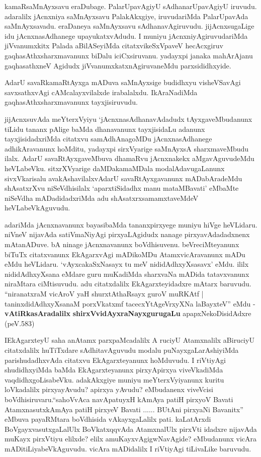\begin{artha}
kamaRsaMnAyxsavu eraDubage. PalarUpavAgiyU sAdhanarUpavAgiyU
iruvudu. adaralilx jAcnxniya saMnAyxsavu PalakAkxgiye, iruvudariMda
PalarUpavAda saMnAyxsavadu. eraDaneya saMnAyxsavu
sAdhanavAgiruvudu. jijAcnxsugaLige idu jAcnxnasAdhanege
upayukatxvAdudu. I muniyu jAcnxniyAgiruvudariMda jiVvanumxkitx Palada aBilASeyiMda citatxvikeSxVpaveV hecAcxgiruv gaqhasAthxsharxmavanunx biDalu iciCxsiruvanu. yadayxpi janaka mahArAjanu gaqhasathxneV Agidudx
jiVvanumxkatxnAgiruvaneMdu parxsididhxyide. 

AdarU savaRkamaRtAyxga mADuva saMnAyxsige budidhxyu visheVSavAgi
savxsathxvAgi cAMcalayxvilalxde irabalalxdu. IkAraNadiMda
gaqhasAthxsharxmavanunx tayxjisiruvudu.

jijAcnxsuvAda meYterxVyiyu `jAcnxnasAdhanavAdadudx tAyxgaveMbudanunx
tiLidu tananx pAlige baMda dhanavanunx tayxjisidaLu adanunx
tayxjisidadxriMda citatxvu samAdhAnagoMDu jAcnxnasAdhanege
adhikAravanunx hoMditu, yadayxpi sirxVyarige saMnAyxsA sharxmaveMbudu
ilalx. AdarU savaRtAyxgaveMbuva dhamaRvu jAcnxnakekx aMgavAguvudeMdu
heVLabeVku. sitxrXVyarige daMDakamaMDala modalAdavugaLanunx
sivxVkarisalu avakAshavilalxvAdarU savaRtAyxgavanunx mADabAradeMdu
shAsatxrXvu niSeVdhisilalx `aparxtiSidadhx manu mataMBavati' eMbaMte niSeVdha mADadidadxriMda
adu shAsatxrxsamamxtaveMdeV heVLabeVkAguvudu.

adariMda  jAcnxnavanunx bayasibaMda tananxpirxyege muniyu hiVge
heVLidaru. niVneV nijavAda satiVmaNiyAgi pirxyaLAgidudx nanage
pirxyavAdadadxnenx mAtanADuve. bA ninage jAcnxnavanunx
boVdhisuvenu. beVreciMteyanunx biTuTx citatxvanunx EkAgarxvAgi
mADikoMDu AtamxvicAravanunx mADu eMdu heVLidaru. `vAyxcakaSxNasayx tu meV nididAdhxyXsasavx' eMdu. ililx
nididAdhxyXsana eMdare guru muKadiMda sharxvaNa mADida tatavxvanunx
niraMtara ciMtisuvudu. adu citatxdalilx EkAgarxteyidadxre mAtarx
baruvudu. ``niranatxraM vicAroV yaH shurxtAthaRsayx guroV muRKAtf | taninxdidAdhxyXsanaM porxVkatxmf tacecxYtAgeVrxyXNa laBayxteV'' eMdu - \textbf{vAtiRkasAradalilx}\textbf{ shirxVvidAyxraNayxgurugaLu} 
apapxNekoDisidAdxre (peV.583)
\end{artha}

\begin{artha}
IEkAgarxteyU saha anAtamx parxpaMcadalilx A ruciyU Atamxnalilx
aBiruciyU citatxdalilx huTiTxdare sAdhitavAguvudu modalu
puNayxgaLarAshiyiMda parishudadhxvAda citatxvu EkAgarxteyanunx
hoMduvudu. I riVtiyAgi shudidhxyiMda baMda EkAgarxteyanunx
pirxyApirxya viveVkadiMda vaqdidhxgoLisabeVku. adakAkxgiye  muniyu
meYterxVyiyanunx kuritu loVkadalilx pirxyayAvudu? apirxya yAvudu?
eMbudanenx viveVcisi boVdhisiruvaru.``sahoVvAca navApatuyxH kAmAya patiH pirxyoV Bavati AtamxnasutxkAmAya patiH pirxyeV Bavati ...... BUtAni pirxyaNi Bavanitx'' eMbuva payaRMtara
boVdhisida vAkayxgaLalilx pati. kaLatArxdi BoVgayxvasutxgaLalUlx
BoVkatxqqvAda AtamxnalUlx pirxVti idadxre nijavAda muKayx pirxVtiyu
elilxde? elilx amuKayxvAgigwNavAgide? eMbudanunx vicAra
mADitiLiyabeVkAguvudu. vicAra mADidalilx I riVtiyAgi tiLivaLike baruvudu.
\end{artha}

